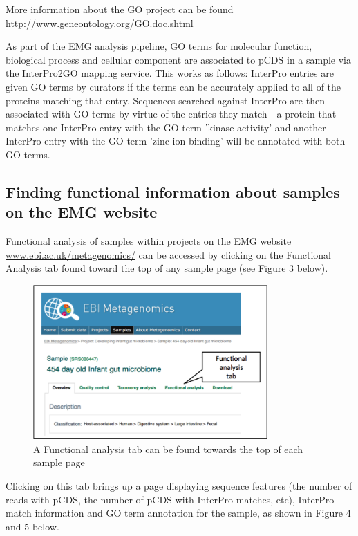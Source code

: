 More information about the GO project can be found \url{http://www.geneontology.org/GO.doc.shtml}

As part of the EMG analysis pipeline, GO terms for molecular function, biological process and cellular component are associated to pCDS in a sample via the InterPro2GO mapping service. This works as follows: InterPro entries are given GO terms by curators if the terms can be accurately applied to all of the proteins matching that entry. Sequences searched against InterPro are then associated with GO terms by virtue of the entries they match - a protein that matches one InterPro entry with the GO term 'kinase activity' and another InterPro entry with the GO term 'zinc ion binding' will be annotated with both GO terms.

\subsection{Finding functional information about samples on the EMG website}

Functional analysis of samples within projects on the EMG website \url{www.ebi.ac.uk/metagenomics/} can be accessed by clicking on the Functional Analysis tab found toward the top of any sample page (see Figure 3 below).

\begin{figure}[Figure 3]
\centering
\includegraphics[width=0.8\textwidth]{handout/FA.png}
\caption{A Functional analysis tab can be found towards the top of each sample page}
\label{fig:FA}
\end{figure}

Clicking on this tab brings up a page displaying sequence features (the number of reads with pCDS, the number of pCDS with InterPro matches, etc), InterPro match information and GO term annotation for the sample, as shown in Figure 4 and 5 below.

